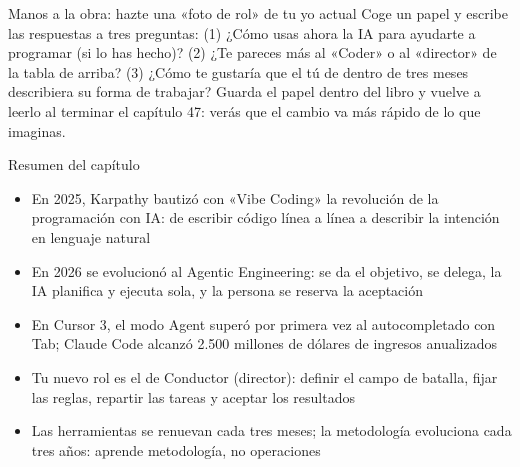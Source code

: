 \begin{tcbpractice}{Manos a la obra: hazte una «foto de rol» de tu yo actual}
Coge un papel y escribe las respuestas a tres preguntas: (1) ¿Cómo usas ahora la IA para ayudarte a programar (si lo has hecho)? (2) ¿Te pareces más al «Coder» o al «director» de la tabla de arriba? (3) ¿Cómo te gustaría que el tú de dentro de tres meses describiera su forma de trabajar? Guarda el papel dentro del libro y vuelve a leerlo al terminar el capítulo 47: verás que el cambio va más rápido de lo que imaginas.

\end{tcbpractice}

\begin{tcbsummary}{Resumen del capítulo}
\begin{itemize}
  \item En 2025, Karpathy bautizó con «Vibe Coding» la revolución de la programación con IA: de escribir código línea a línea a describir la intención en lenguaje natural
  \item En 2026 se evolucionó al Agentic Engineering: se da el objetivo, se delega, la IA planifica y ejecuta sola, y la persona se reserva la aceptación
  \item En Cursor 3, el modo Agent superó por primera vez al autocompletado con Tab; Claude Code alcanzó 2.500 millones de dólares de ingresos anualizados
  \item Tu nuevo rol es el de Conductor (director): definir el campo de batalla, fijar las reglas, repartir las tareas y aceptar los resultados
  \item Las herramientas se renuevan cada tres meses; la metodología evoluciona cada tres años: aprende metodología, no operaciones
\end{itemize}

\end{tcbsummary}
